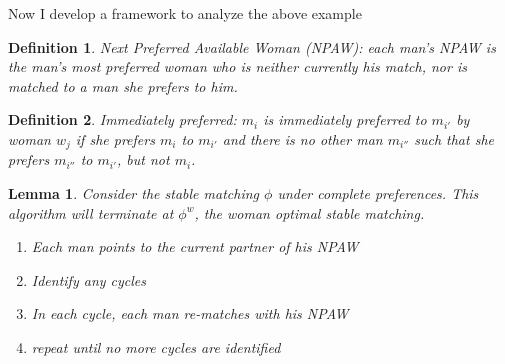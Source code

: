 \documentclass[WP]{AEA}
\newtheorem{lemma}{Lemma}
\newtheorem{deff}{Definition}
\begin{document}
Now I develop a framework to analyze the above example
\begin{deff}
	Next Preferred Available Woman (NPAW): each man's NPAW is the man's most preferred woman who is neither currently his match, nor is matched to a man she prefers to him. 
\end{deff}

\begin{deff}
	Immediately preferred: $m_i$ is immediately preferred to $m_{i'}$ by woman $w_j$ if she prefers  $m_{i}$ to $m_{i'}$ and there is no other man $m_{i''}$ such that she prefers $m_{i''}$ to $m_{i'}$, but not $m_{i}$.
\end{deff}



\begin{lemma}
	Consider the stable matching $\phi$ under complete preferences. This algorithm will terminate at  $\phi^w$, the woman optimal stable matching.
	\begin{enumerate}
		\item Each man points to the current partner of his NPAW
		\item Identify any cycles
		\item \label{new_match} In each cycle, each man re-matches with his NPAW
		\item repeat until no more cycles are identified
	\end{enumerate}
\end{lemma}
\end{document}
